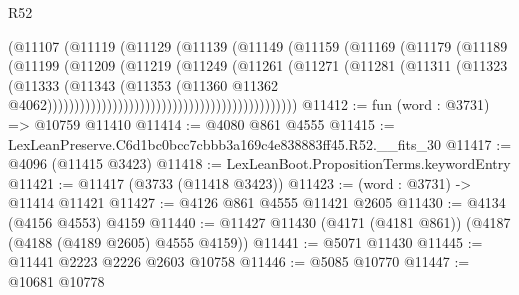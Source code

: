\begin{lexlean}{R52}
\begin{coremodule}
                                                    (@11107
                                                      (@11119
                                                        (@11129
                                                          (@11139
                                                            (@11149
                                                              (@11159
                                                                (@11169
                                                                  (@11179
                                                                    (@11189
                                                                      (@11199
                                                                        (@11209
                                                                          (@11219
                                                                            (@11249
                                                                              (@11261
                                                                                (@11271
                                                                                  (@11281
                                                                                    (@11311
                                                                                      (@11323
                                                                                        (@11333
                                                                                          (@11343
                                                                                            (@11353
                                                                                              (@11360
                                                                                                @11362
                                                                                                @4062))))))))))))))))))))))))))))))))))))))))))))))
@11412 := fun (word : @3731) => @10759 @11410
@11414 := @4080 @861 @4555
@11415 := LexLeanPreserve.C6d1bc0bcc7cbbb3a169c4e838883ff45.R52.__fits_30
@11417 := @4096 (@11415 @3423)
@11418 := LexLeanBoot.PropositionTerms.keywordEntry
@11421 := @11417 (@3733 (@11418 @3423))
@11423 := (word : @3731) -> @11414 @11421
@11427 := @4126 @861 @4555 @11421 @2605
@11430 := @4134 (@4156 @4553) @4159
@11440 := @11427 @11430 (@4171 (@4181 @861)) (@4187 (@4188 (@4189 @2605) @4555 @4159))
@11441 := @5071 @11430
@11445 := @11441 @2223 @2226 @2603 @10758
@11446 := @5085 @10770
@11447 := @10681 @10778

\end{coremodule}
\end{lexlean}
